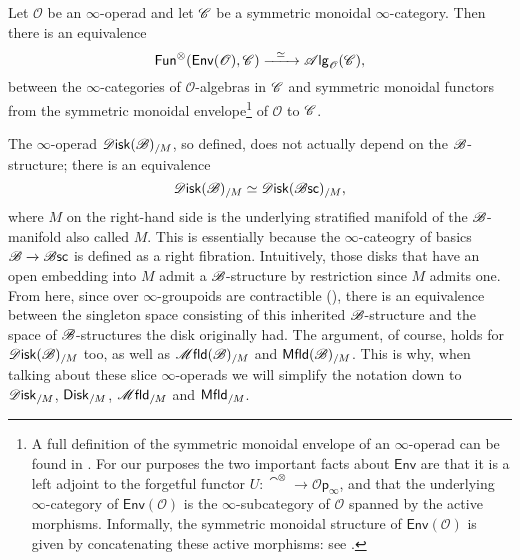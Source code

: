 \documentclass[../text]{subfiles}
\begin{document}
\begin{proposition}\label{NBR8AQB}
    Let $\mathscr{O}$ be an $\infty$-operad and let $\mathscr{C}$ be a symmetric monoidal $\infty$-category. Then there is an equivalence
    \begin{equation}
        \mathsf{Fun}^\otimes (\mathsf{Env}(\mathscr{O}), \mathscr{C}) \xrightarrow{\ \ \simeq \ \ } \mathscr{A} \mathsf{lg}_{\mathscr{O}} (\mathscr{C}),
    \end{equation}
    between the $\infty$-categories of $\mathscr{O}$-algebras in $\mathscr{C}$ and symmetric monoidal functors from the symmetric monoidal envelope\footnote{A full definition of the symmetric monoidal envelope of an $\infty$-operad can be found in \cite[§2.2.4]{lurie_ha}. For our purposes the two important facts about $\mathsf{Env}$ are that it is a left adjoint to the forgetful functor $U: \cat^\otimes \xrightarrow{} \mathscr{O}\mathsf{p}_{\infty}$, and that the underlying $\infty$-category of $\mathsf{Env} (\mathscr{O})$ is the $\infty$-subcategory of $\mathscr{O}$ spanned by the active morphisms. Informally, the symmetric monoidal structure of $\mathsf{Env}(\mathscr{O})$ is given by concatenating these active morphisms: see \cite[Remark 2.2.4.6]{lurie_ha}.} of $\mathscr{O}$ to $\mathscr{C}$.
\end{proposition}

\begin{remark}\label{rem:disk_b=disk_bsc}
    The $\infty$-operad $\disk(\bstr)_{/M}$, so defined, does not actually depend on the $\mathscr{B}$-structure; there is an equivalence
    \begin{equation}
        \disk(\bstr)_{/M} \simeq \disk(\bsc)_{/M},
    \end{equation}
    where $M$ on the right-hand side is the underlying stratified manifold of the $\mathscr{B}$-manifold also called $M$. This is essentially because the $\infty$-cateogry of basics $\mathscr{B} \xrightarrow{} \mathscr{B} \mathsf{sc}$ is defined as a right fibration. Intuitively, those disks that have an open embedding into $M$ admit a $\mathscr{B}$-structure by restriction since $M$ admits one. From here, since over $\infty$-groupoids are contractible (\cite[\href{https://kerodon.net/tag/018Y}{018Y}]{lurie_kerodon}), there is an equivalence between the singleton space consisting of this inherited $\mathscr{B}$-structure and the space of $\mathscr{B}$-structures the disk originally had. The argument, of course, holds for $\disk(\bstr)_{/M}$ too, as well as $\mfld(\bstr)_{/M}$ and $\mfld[r](\bstr)_{/M}$. This is why, when talking about these slice $\infty$-operads we will simplify the notation down to $\disk_{/M}$, $\disk[r]_{/M}$, $\mfld_{/M}$ and $\mfld[r]_{/M}$.
\end{remark}
\end{document}
